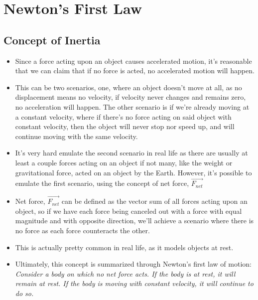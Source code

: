 \documentclass[openany]{book}
\begin{document}
\section{Newton's First Law} 
\subsection{Concept of Inertia}
\begin{itemize}
    \item Since a force acting upon an object causes accelerated motion, it's reasonable that we can claim that if no force is acted, no accelerated motion will happen.
    \item This can be two scenarios, one, where an object doesn't move at all, as no displacement means no velocity, if velocity never changes and remains zero, no acceleration will happen. The other scenario is if we're already moving at a constant velocity, where if there's no force acting on said object with constant velocity, then the object will never stop nor speed up, and will continue moving with the same velocity.
    \item It's very hard emulate the second scenario in real life as there are usually at least a couple forces acting on an object if not many, like the weight or gravitational force, acted on an object by the Earth. However, it's possible to emulate the first scenario, using the concept of net force, $\vec{F_{net}}$
    \item Net force, $\vec{F_{net}}$ can be defined as the vector sum of all forces acting upon an object, so if we have each force being canceled out with a force with equal magnitude and with opposite direction, we'll achieve a scenario where there is no force as each force counteracts the other.
    \item This is actually pretty common in real life, as it models objects at rest.
    \item Ultimately, this concept is summarized through Newton's first law of motion: {\textit{Consider a body on which no net force acts. If the body is at rest, it will remain at rest. If the body is moving with constant velocity, it will continue to do so.}}
\end{itemize}
\end{document}
